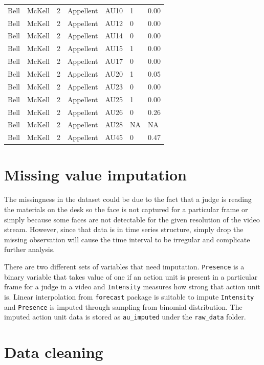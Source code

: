 \documentclass{monashthesis}
\begin{document}
\begin{table}[ht]
\begin{center}
\begin{tabular}{lllllll}
Bell & McKell & 2 & Appellent & AU10 &  1 & 0.00 \\
Bell & McKell & 2 & Appellent & AU12 &  0 & 0.00 \\
Bell & McKell & 2 & Appellent & AU14 &  0 & 0.00 \\
Bell & McKell & 2 & Appellent & AU15 &  1 & 0.00 \\
Bell & McKell & 2 & Appellent & AU17 &  0 & 0.00 \\
Bell & McKell & 2 & Appellent & AU20 &  1 & 0.05 \\
Bell & McKell & 2 & Appellent & AU23 &  0 & 0.00 \\
Bell & McKell & 2 & Appellent & AU25 &  1 & 0.00 \\
Bell & McKell & 2 & Appellent & AU26 &  0 & 0.26 \\
Bell & McKell & 2 & Appellent & AU28 & NA &   NA \\
Bell & McKell & 2 & Appellent & AU45 &  0 & 0.47 \\
\bottomrule
\end{tabular}
\end{center}
\end{table}

\hypertarget{missing-value-imputation}{%
\section{Missing value imputation}\label{missing-value-imputation}}

The missingness in the dataset could be due to the fact that a judge is reading the materials on the desk so the face is not captured for a particular frame or simply because some faces are not detectable for the given resolution of the video stream. However, since that data is in time series structure, simply drop the missing observation will cause the time interval to be irregular and complicate further analysis.

There are two different sets of variables that need imputation. \texttt{Presence} is a binary variable that takes value of one if an action unit is present in a particular frame for a judge in a video and \texttt{Intensity} measures how strong that action unit is. Linear interpolation from \texttt{forecast} package is suitable to impute \texttt{Intensity} and \texttt{Presence} is imputed through sampling from binomial distribution. The imputed action unit data is stored as \texttt{au\_imputed} under the \texttt{raw\_data} folder.

\hypertarget{data-cleaning}{%
\section{Data cleaning}\label{data-cleaning}}
\end{document}
